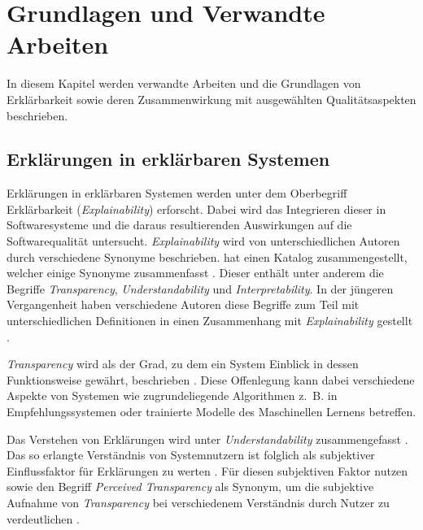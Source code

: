 \chapter{Grundlagen und Verwandte Arbeiten}

In diesem Kapitel werden verwandte Arbeiten und die Grundlagen von Erklärbarkeit sowie deren Zusammenwirkung mit ausgewählten Qualitätsaspekten beschrieben.

\section{Erklärungen in erklärbaren Systemen}
\label{02_basics:explainable_system}

Erklärungen in erklärbaren Systemen werden unter dem Oberbegriff Erklärbarkeit (\textit{Explainability}) erforscht. Dabei wird das Integrieren dieser in Softwaresysteme und die daraus resultierenden Auswirkungen auf die Softwarequalität untersucht. \textit{Explainability} wird von unterschiedlichen Autoren durch verschiedene Synonyme beschrieben. \citeauthor{brennen_what_2020} hat einen Katalog zusammengestellt, welcher einige Synonyme zusammenfasst \cite{brennen_what_2020}. Dieser enthält unter anderem die Begriffe \textit{Transparency}, \textit{Understandability} und \textit{Interpretability}. In der jüngeren Vergangenheit haben verschiedene Autoren diese Begriffe zum Teil mit unterschiedlichen Definitionen in einen Zusammenhang mit \textit{Explainability} gestellt \cite{chazette_end-users_nodate,chazette_knowledge_nodate,kohl_explainability_2019,wang_integration_2020}.

\textit{Transparency} wird als der Grad, zu dem ein System Einblick in dessen Funktionsweise gewährt, beschrieben \cite{chazette_end-users_nodate}. Diese Offenlegung kann dabei verschiedene Aspekte von Systemen wie zugrundeliegende Algorithmen z.~B. in Empfehlungssystemen \cite{balog_measuring_2020} oder trainierte Modelle des Maschinellen Lernens \cite{sovrano_modelling_2020} betreffen.

Das Verstehen von Erklärungen wird unter \textit{Understandability} zusammengefasst \cite{do2010software}. Das so erlangte Verständnis von Systemnutzern ist folglich als subjektiver Einflussfaktor für Erklärungen zu werten \cite{chazette_end-users_nodate}. Für diesen subjektiven Faktor nutzen \citeauthor{wang_integration_2020} sowie \citeauthor{balog_measuring_2020} den Begriff \textit{Perceived Transparency} als Synonym, um die subjektive Aufnahme von \textit{Transparency} bei verschiedenem Verständnis durch Nutzer zu verdeutlichen \cite{wang_integration_2020, balog_measuring_2020}.

